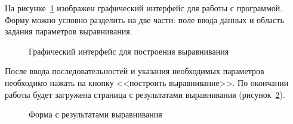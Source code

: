 На рисунке~\ref{ris:webka} изображен графический интерфейс для работы с программой. Форму можно условно разделить на две части: поле ввода данных и область задания параметров выравнивания. 

\begin{figure}[h]
	\caption{Графический интерфейс для построения выравнивания}
	\label{ris:webka}
\end{figure}

После ввода последовательностей и указания необходимых параметров необходимо нажать на кнопку <<построить выравнивание>>. По окончании работы будет загружена страница с результатами выравнивания (рисунок~\ref{ris:webkares}).

\begin{figure}[h]
	\caption{Форма с результатами выравнивания}
	\label{ris:webkares}
\end{figure}